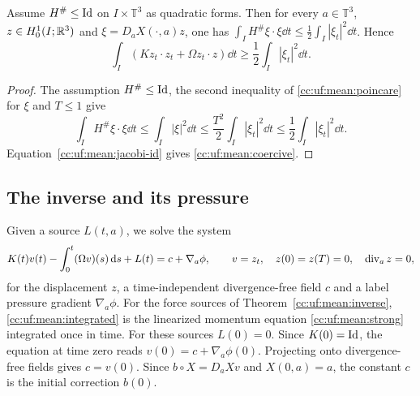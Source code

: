 \begin{lemma}\label{cc:uf:mean:hardy}
Assume $H^\#\le\operatorname{Id}$ on $I\times\mathbb T^3$ as quadratic forms. Then
for every $a\in\mathbb T^3$, $z\in H^1_0(I;\mathbb R^3)$ and
$\xi=D_aX(\cdot,a)z$, one has
$\int_I H^\#\xi\cdot\xi\dd t\le\frac12\int_I|\xi_t|^2\dd t$. Hence
\begin{equation}\label{cc:uf:mean:coercive}
 \int_I(Kz_t\cdot z_t+\Omega z_t\cdot z)\dd t
 \ge\frac12\int_I|\xi_t|^2\dd t.
\end{equation}
\end{lemma}
\begin{proof}
The assumption $H^\#\le\operatorname{Id}$, the second inequality of
\eqref{cc:uf:mean:poincare} for $\xi$ and $T\le1$ give
\[
 \int_I H^\#\xi\cdot\xi\dd t
 \le\int_I|\xi|^2\dd t
 \le\frac{T^2}2\int_I|\xi_t|^2\dd t
 \le\frac12\int_I|\xi_t|^2\dd t.
\]
Equation~\eqref{cc:uf:mean:jacobi-id} gives
\eqref{cc:uf:mean:coercive}.
\end{proof}

\subsection{The inverse and its pressure}\label{cc:uf:sec:mean}

Given a source $L(t,a)$, we solve the system
\begin{equation}\label{cc:uf:mean:integrated}
 K(t)v(t)-\int_0^t(\Omega v)(s)\,\mathrm d s+L(t)=c+\nabla_a\phi,
 \qquad v=z_t,\quad z(0)=z(T)=0,\quad\operatorname{div}_a z=0,
\end{equation}
for the displacement $z$, a time-independent divergence-free field $c$
and a label pressure gradient $\nabla_a\phi$. For the force sources of
Theorem~\ref{cc:uf:mean:inverse}, \eqref{cc:uf:mean:integrated} is the
linearized momentum equation \eqref{cc:uf:mean:strong} integrated once
in time. For these sources $L(0)=0$. Since $K(0)=\operatorname{Id}$, the equation
at time zero reads $v(0)=c+\nabla_a\phi(0)$. Projecting
onto divergence-free fields gives $c=v(0)$. Since $b\circ X=D_aXv$
and $X(0,a)=a$, the constant $c$ is the initial correction $b(0)$.

